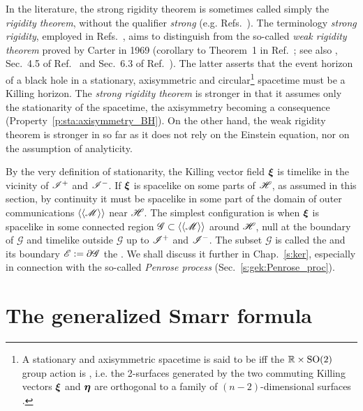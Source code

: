 In the literature, the strong rigidity theorem is sometimes called
simply the \emph{rigidity theorem}, without the qualifier \emph{strong}
(e.g. Refs.~\cite{Choqu09,HollaI12}).
The terminology \emph{strong rigidity}, employed in Refs.~\cite{Carte99,ChrusLH12,Heusl96},
aims to distinguish from the so-called
\emph{weak rigidity theorem}
proved by Carter in 1969 (corollary to Theorem~1 in Ref.~\cite{Carte69}; see also \cite{Carte72}, Sec.~4.5 of Ref.~\cite{Carte87} and Sec.~6.3 of Ref.~\cite{Heusl96}). The latter asserts that the event horizon of a black hole in a stationary, axisymmetric
and circular\footnote{A stationary and axisymmetric spacetime is said to be  iff the $\mathbb{R}\times\mathrm{SO}(2)$ group action
is , i.e. the 2-surfaces generated by the two commuting
Killing vectors $\bm{\xi}$ and $\bm{\eta}$ are orthogonal to a family of $(n-2)$-dimensional surfaces \cite{Carte69}.}
spacetime must be a Killing horizon. The \emph{strong rigidity theorem} is
stronger in that it assumes only the stationarity of the spacetime, the axisymmetry
becoming a consequence (Property~\ref{p:sta:axisymmetry_BH}). On the other hand,
the weak rigidity theorem is stronger in so far as it does not rely on
the Einstein equation, nor on the assumption of analyticity.

By the very definition of stationarity, the Killing vector field $\bm{\xi}$ is
timelike in the vicinity of $\mathscr{I}^+$ and $\mathscr{I}^-$. If $\bm{\xi}$ is spacelike
on some parts of $\mathscr{H}$, as assumed in this section, by continuity it must be spacelike
in some part of the domain of outer communications $\langle\langle \mathscr{M}\rangle\rangle$
near $\mathscr{H}$. The simplest configuration is when
$\bm{\xi}$ is spacelike in some connected region $\mathscr{G}\subset \langle\langle \mathscr{M}\rangle\rangle$
around $\mathscr{H}$, null at the boundary of $\mathscr{G}$ and timelike outside $\mathscr{G}$
up to $\mathscr{I}^+$ and $\mathscr{I}^-$. The subset $\mathscr{G}$ is
called the  and its boundary $\mathscr{E}:=\partial\mathscr{G}$
the . We shall discuss it further in Chap.~\ref{s:ker},
especially in connection with the so-called \emph{Penrose process}
(Sec.~\ref{s:gek:Penrose_proc}).


\section{The generalized Smarr formula} \label{s:sta:Smarr}

